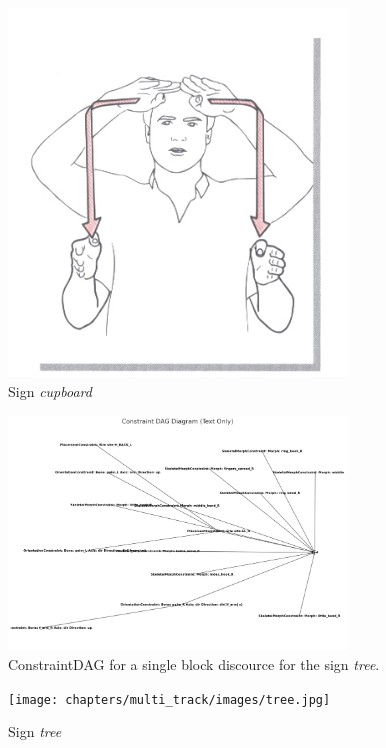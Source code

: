 \documentclass[../../main.tex]{subfiles}
\begin{document}
\begin{figure}
    \centering
    \includegraphics[width=0.8\textwidth]{chapters/multi_track/images/cupboard.jpg}
    \caption{Sign \emph{cupboard}~\cite{moody97}}
    \label{fig:armoire_sign}
\end{figure}

\begin{figure}[h]
    \centering
    \includegraphics[width=0.8\textwidth]{chapters/multi_track/images/constraint_dag.png}
    \caption{ConstraintDAG for a single block discource for the sign \emph{tree}.}
    \label{fig:constraint_dag_tree}
\end{figure}

\begin{figure}
    \centering
    \texttt{[image: chapters/multi\_track/images/tree.jpg]}
    \caption{Sign \emph{tree}}
    \label{fig:tree_sign}
\end{figure}
\end{document}
